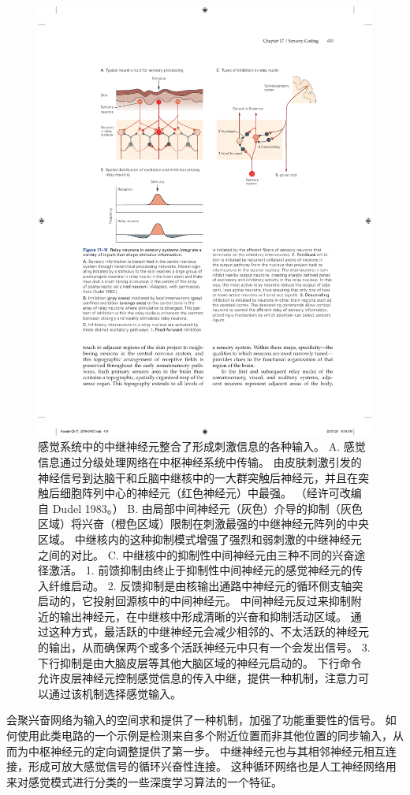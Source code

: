 \begin{figure}[htbp]
	\centering
	\includegraphics[width=0.7\linewidth]{chap17/fig_17_11}
	\caption{感觉系统中的中继神经元整合了形成刺激信息的各种输入。 
		A. 感觉信息通过分级处理网络在中枢神经系统中传输。 
		由皮肤刺激引发的神经信号到达脑干和丘脑中继核中的一大群突触后神经元，并且在突触后细胞阵列中心的神经元（红色神经元）中最强。 （经许可改编自 Dudel 1983。） 
		B. 由局部中间神经元（灰色）介导的抑制（灰色区域）将兴奋（橙色区域）限制在刺激最强的中继神经元阵列的中央区域。 
		中继核内的这种抑制模式增强了强烈和弱刺激的中继神经元之间的对比。 
		C. 中继核中的抑制性中间神经元由三种不同的兴奋途径激活。 
		1. 前馈抑制由终止于抑制性中间神经元的感觉神经元的传入纤维启动。 
		2. 反馈抑制是由核输出通路中神经元的循环侧支轴突启动的，它投射回源核中的中间神经元。 
		中间神经元反过来抑制附近的输出神经元，在中继核中形成清晰的兴奋和抑制活动区域。 
		通过这种方式，最活跃的中继神经元会减少相邻的、不太活跃的神经元的输出，从而确保两个或多个活跃神经元中只有一个会发出信号。 
		3. 下行抑制是由大脑皮层等其他大脑区域的神经元启动的。 
		下行命令允许皮层神经元控制感觉信息的传入中继，提供一种机制，注意力可以通过该机制选择感觉输入。}
	\label{fig:17_11}
\end{figure}


会聚兴奋网络为输入的空间求和提供了一种机制，加强了功能重要性的信号。 
如何使用此类电路的一个示例是检测来自多个附近位置而非其他位置的同步输入，从而为中枢神经元的定向调整提供了第一步。 
中继神经元也与其相邻神经元相互连接，形成可放大感觉信号的循环兴奋性连接。 
这种循环网络也是人工神经网络用来对感觉模式进行分类的一些深度学习算法的一个特征。


